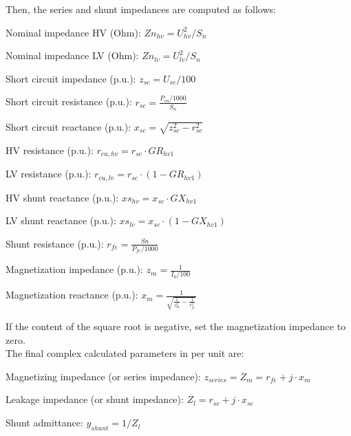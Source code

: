 \documentclass[11pt,fleqn]{book} %
\begin{document}
Then, the series and shunt impedances are computed as follows:

Nominal impedance HV (Ohm): $Zn_{hv} = U_{hv}^2 / S_n$ \newline


Nominal impedance LV (Ohm): $Zn_{lv} = U_{lv}^2 / S_n$ \newline


Short circuit impedance (p.u.): $z_{sc} = U_{sc} / 100$\newline

Short circuit resistance (p.u.): $r_{sc} = \frac{P_{cu} / 1000}{S_n}$\newline

Short circuit reactance (p.u.): $x_{sc} = \sqrt{z_{sc}^2 - r_{sc} ^2}$\newline


HV resistance (p.u.): $r_{cu,hv} = r_{sc} \cdot GR_{hv1}$\newline


LV resistance (p.u.): $r_{cu,lv} = r_{sc} \cdot (1 - GR_{hv1})$\newline


HV shunt reactance (p.u.): $xs_{hv} = x_{sc} \cdot GX_{hv1}$\newline


LV shunt reactance (p.u.): $xs_{lv} = x_{sc} \cdot (1 - GX_{hv1})$\newline

Shunt resistance (p.u.): $r_{fe} = \frac{Sn}{P_{fe} / 1000}$\newline


Magnetization impedance (p.u.): $z_m = \frac{1}{I_0 / 100}$\newline

Magnetization reactance (p.u.): $x_m = \frac{1}{\sqrt{\frac{1}{z_m^2} - \frac{1}{r_{fe}^2}}}$ \newline

If the content of the square root is negative, set the magnetization impedance to zero.\\


The final complex calculated parameters in per unit are:

Magnetizing impedance (or series impedance): $z_{series} = Z_m = r_{fe} +j \cdot x_m$

Leakage impedance (or shunt impedance): $Z_l = r_{sc} + j \cdot x_{sc}$

Shunt admittance: $y_{shunt} = 1 / Z_l$

\end{document}
